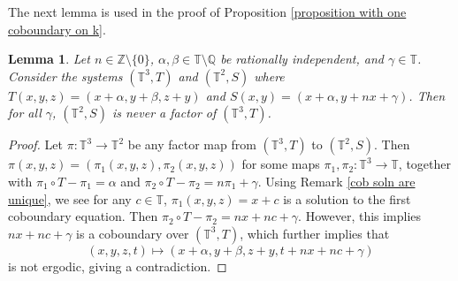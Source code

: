 \documentclass[12pt]{amsart}
\theoremstyle{definition}
\theoremstyle{plain}
\newtheorem{lemma}[theorem]{Lemma}
\theoremstyle{definition}
\newtheorem{remark}[theorem]{Remark}
\numberwithin{equation}{section}
\begin{document}

The next lemma is used in the proof of Proposition \ref{proposition with one coboundary on k}.

\begin{lemma}\label{ofcourse this is true}
      Let $n \in \mathbb{Z} \setminus \{0\}$, $\alpha,\beta \in \mathbb{T}\setminus \mathbb{Q}$ be rationally independent, and $\gamma \in \mathbb{T}$. Consider the systems $(\mathbb{T}^{3},T)$ and $(\mathbb{T}^{2},S)$ where $T(x,y,z)=(x+\alpha,y+\beta,z+y)$ and $S(x,y)=(x+\alpha,y+nx+\gamma)$. Then for all $\gamma$, $(\mathbb{T}^{2},S)$ is never a factor of $(\mathbb{T}^{3},T)$.
  \end{lemma}

  \begin{proof}
       Let $\pi\colon\mathbb{T}^{3} \rightarrow \mathbb{T}^{2}$ be any factor map from $(\mathbb{T}^3,T)$ to $(\mathbb{T}^{2},S)$. Then $\pi(x,y,z)=(\pi_1(x,y,z),\pi_2(x,y,z))$ for some maps $\pi_1,\pi_2\colon \mathbb{T}^{3}\rightarrow \mathbb{T}$, together with $\pi_1 \circ T-\pi_1=\alpha$ and $\pi_2 \circ T- \pi_2=n \pi_1 +\gamma$. Using Remark \ref{cob soln are unique}, we see for any $c \in \mathbb{T}$, $\pi_1(x,y,z)=x+c$ is a solution to the first coboundary equation. Then $\pi_2 \circ T-\pi_2=nx+nc+\gamma$. However, this implies $nx+nc+\gamma$ is a coboundary over $(\mathbb{T}^{3},T)$, which further implies that $$(x,y,z,t) \mapsto (x+\alpha,y+\beta,z+y,t+nx+nc+\gamma)$$ is not ergodic, giving a contradiction.
  \end{proof}


\end{document}
